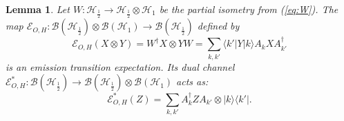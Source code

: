 \documentclass[12pt,a4paper]{article}
\newtheorem{lemma}[theorem]{Lemma}
\begin{document}
\begin{lemma}\label{lem:emission_transition}
Let $W: \mathcal{H}_{\frac{1}{2}} \to \mathcal{H}_{\frac{1}{2}} \otimes \mathcal{H}_{1}$ be the partial isometry from (\ref{eq:W}). The  map $\mathcal{E}_{O,H}: \mathcal{B}(\mathcal{H}_{\frac{1}{2}}) \otimes \mathcal{B}(\mathcal{H}_{1}) \to \mathcal{B}(\mathcal{H}_{\frac{1}{2}})$ defined by
\begin{equation}\label{eq:EOH}
\mathcal{E}_{O,H}(X \otimes Y) = W^{\dagger} X\otimes Y W = \sum_{k,k'} \langle k' | Y | k \rangle  A_{k} X A_{k'}^{\dagger}
\end{equation}
is an emission transition expectation. Its dual channel $\mathcal{E}_{O,H}^*: \mathcal{B}(\mathcal{H}_{\frac{1}{2}}) \to \mathcal{B}(\mathcal{H}_{\frac{1}{2}}) \otimes \mathcal{B}(\mathcal{H}_{1})$ acts as:
\begin{equation}\label{eq:EOH_dual}
\mathcal{E}_{O,H}^*(Z) = \sum_{k,k'} A_{k}^{\dagger} Z A_{k'} \otimes |k\rangle\langle k'|.
\end{equation}
\end{lemma}
\end{document}
